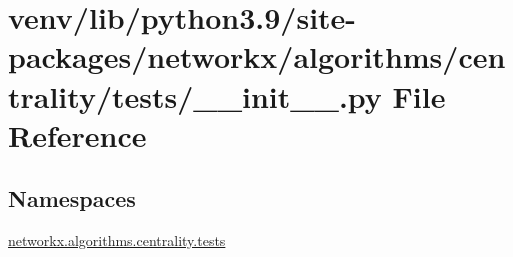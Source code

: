 \hypertarget{venv_2lib_2python3_89_2site-packages_2networkx_2algorithms_2centrality_2tests_2____init_____8py}{}\section{venv/lib/python3.9/site-\/packages/networkx/algorithms/centrality/tests/\+\_\+\+\_\+init\+\_\+\+\_\+.py File Reference}
\label{venv_2lib_2python3_89_2site-packages_2networkx_2algorithms_2centrality_2tests_2____init_____8py}
\subsection*{Namespaces}
\begin{DoxyCompactItemize}
\item 
 \hyperlink{namespacenetworkx_1_1algorithms_1_1centrality_1_1tests}{networkx.\+algorithms.\+centrality.\+tests}
\end{DoxyCompactItemize}
